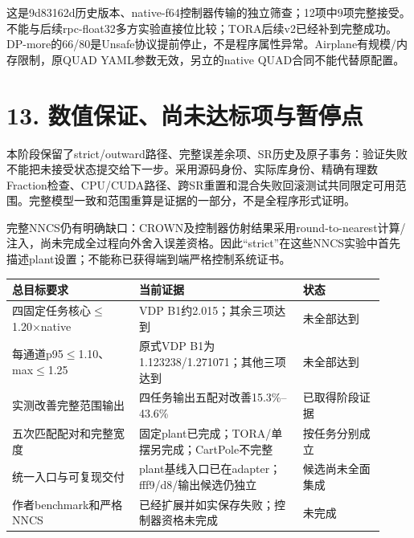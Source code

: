 \documentclass[UTF8,fontset=fandol,11pt,a4paper]{ctexart}
\begin{document}
\normalsize
这是9d83162d历史版本、native-f64控制器传输的独立筛查；12项中9项完整接受。不能与后续rpc-float32多方实验直接位比较；TORA后续v2已经补到完整成功。DP-more的66/\allowbreak{}80是Unsafe协议提前停止，不是程序属性异常。Airplane有规模/\allowbreak{}内存限制，原QUAD YAML参数无效，另立的native QUAD合同不能代替原配置。

\section*{13. 数值保证、尚未达标项与暂停点}
本阶段保留了strict/\allowbreak{}outward路径、完整误差余项、SR历史及原子事务：验证失败不能把未接受状态提交给下一步。采用源码身份、实际库身份、精确有理数Fraction检查、CPU/\allowbreak{}CUDA路径、跨SR重置和混合失败回滚测试共同限定可用范围。完整模型一致和范围重算是证据的一部分，不是全程序形式证明。

完整NNCS仍有明确缺口：CROWN及控制器仿射结果采用round-to-nearest计算/\allowbreak{}注入，尚未完成全过程向外舍入误差资格。因此“strict”在这些NNCS实验中首先描述plant设置；不能称已获得端到端严格控制系统证书。

\small
\par\noindent
{\setlength{\tabcolsep}{2pt}\renewcommand{\arraystretch}{1.25}
\begin{tabular}{>{\raggedright\arraybackslash}p{0.313\linewidth}>{\raggedright\arraybackslash}p{0.405\linewidth}>{\raggedright\arraybackslash}p{0.202\linewidth}}
\toprule
\textbf{总目标要求} & \textbf{当前证据} & \textbf{状态} \\
\midrule
四固定任务核心$\leq$1.20×native & VDP B1约2.015；其余三项达到 & 未全部达到 \\
每通道p95$\leq$1.10、max$\leq$1.25 & 原式VDP B1为1.123238/\allowbreak{}1.271071；其他三项达到 & 未全部达到 \\
实测改善完整范围输出 & 四任务输出五配对改善15.3\%–43.6\% & 已取得阶段证据 \\
五次匹配配对和完整宽度 & 固定plant已完成；TORA/\allowbreak{}单摆另完成；CartPole不完整 & 按任务分别成立 \\
统一入口与可复现交付 & plant基线入口已在adapter；fff9/\allowbreak{}d8/\allowbreak{}输出候选仍独立 & 候选尚未全面集成 \\
作者benchmark和严格NNCS & 已经扩展并如实保存失败；控制器资格未完成 & 未完成 \\
\bottomrule
\end{tabular}
}
\par
\end{document}

